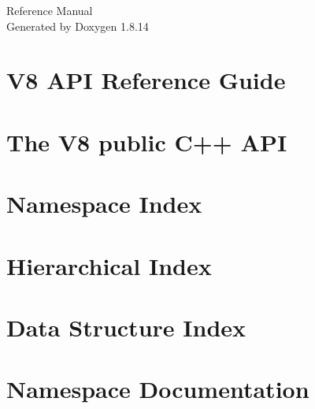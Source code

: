 \documentclass[twoside]{book}
\newcommand{\+}{\discretionary{\mbox{\scriptsize$\hookleftarrow$}}{}{}}
\newcommand{\clearemptydoublepage}{%
  \newpage{\pagestyle{empty}\cleardoublepage}%
}
\begin{document}
\hypersetup{pageanchor=false,
             bookmarksnumbered=true,
             pdfencoding=unicode
            }
\begin{titlepage}
\vspace*{7cm}
\begin{center}%
{\Large Reference Manual}\\
\vspace*{1cm}
{\large Generated by Doxygen 1.8.14}\\
\end{center}
\end{titlepage}
\clearemptydoublepage
{}
\tableofcontents
\clearemptydoublepage
{}
\hypersetup{pageanchor=true}

\chapter{V8 A\+PI Reference Guide}
\label{index}\hypertarget{index}{}
\chapter{The V8 public C++ A\+PI}
\label{md_v8_include_APIDesign}

\chapter{Namespace Index}

\chapter{Hierarchical Index}

\chapter{Data Structure Index}

\chapter{Namespace Documentation}

\end{document}
